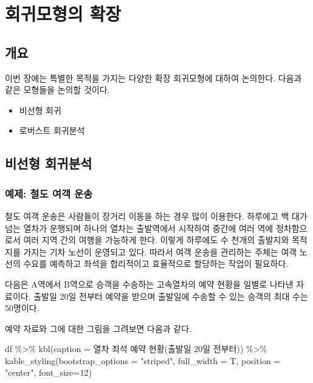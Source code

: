 \documentclass[
  10pt,
]{book}
\newenvironment{Shaded}{\begin{snugshade}}{\end{snugshade}}
\newcommand{\AttributeTok}[1]{\textcolor[rgb]{0.77,0.63,0.00}{#1}}
\newcommand{\DecValTok}[1]{\textcolor[rgb]{0.00,0.00,0.81}{#1}}
\newcommand{\FunctionTok}[1]{\textcolor[rgb]{0.00,0.00,0.00}{#1}}
\newcommand{\NormalTok}[1]{#1}
\newcommand{\SpecialCharTok}[1]{\textcolor[rgb]{0.00,0.00,0.00}{#1}}
\newcommand{\StringTok}[1]{\textcolor[rgb]{0.31,0.60,0.02}{#1}}
\providecommand{\tightlist}{%
  \setlength{\itemsep}{0pt}\setlength{\parskip}{0pt}}
\theoremstyle{definition}
\theoremstyle{definition}
\theoremstyle{definition}
\theoremstyle{definition}
\theoremstyle{remark}
\begin{document}
\hypertarget{extension}{%
\chapter{회귀모형의 확장}\label{extension}}

\hypertarget{uxac1cuxc694}{%
\section{개요}\label{uxac1cuxc694}}

이번 장에는 특별한 목적을 가지는 다양한 확장 회귀모형에 대하여 논의한다. 다음과 같은 모형들을 논의할 것이다.

\begin{itemize}
\tightlist
\item
  비선형 회귀
\item
  로버스트 회귀분석
\end{itemize}

\hypertarget{uxbe44uxc120uxd615-uxd68cuxadc0uxbd84uxc11d}{%
\section{비선형 회귀분석}\label{uxbe44uxc120uxd615-uxd68cuxadc0uxbd84uxc11d}}

\hypertarget{uxc608uxc81c-uxcca0uxb3c4-uxc5ecuxac1d-uxc6b4uxc1a1}{%
\subsection{예제: 철도 여객 운송}\label{uxc608uxc81c-uxcca0uxb3c4-uxc5ecuxac1d-uxc6b4uxc1a1}}

철도 여객 운송은 사람들이 장거리 이동을 하는 경우 많이 이용한다. 하루에고 백 대가 넘는
열차가 운행되며 하나의 열차는 출발역에서 시작하여 중간에 여러 역에 정차함으로서 여러 지역 간의 여행을 가능하게 한다. 이렇게 하루에도 수 천개의 출발지와 목적지를 가지는 기차 노선이 운영되고 있다. 따라서 여객 운송을 관리하는 주체는 여객 노선의 수요를 예측하고 좌석을 합리적이고 효율적으로 할당하는 작업이 필요하다.

다음은 A역에서 B역으로 승객을 수송하는 고속열차의 예약 현황을 일별로 나타낸 자료이다.
출발일 20일 전부터 예약을 받으며 출발일에 수송할 수 있는 승객의 최대 수는 50명이다.

예약 자료와 그에 대한 그림을 그려보면 다음과 같다.

\begin{Shaded}
\begin{Highlighting}[]
\NormalTok{df }\SpecialCharTok{\%\textgreater{}\%} \FunctionTok{kbl}\NormalTok{(}\AttributeTok{caption =} \StringTok{\textquotesingle{}열차 죄석 예약 현황(출발일 20일 전부터)\textquotesingle{}}\NormalTok{) }\SpecialCharTok{\%\textgreater{}\%}
  \FunctionTok{kable\_styling}\NormalTok{(}\AttributeTok{bootstrap\_options =} \StringTok{"striped"}\NormalTok{, }\AttributeTok{full\_width =}\NormalTok{ T, }\AttributeTok{position =} \StringTok{"center"}\NormalTok{, }\AttributeTok{font\_size=}\DecValTok{12}\NormalTok{)}
\end{Highlighting}
\end{Shaded}
\end{document}

